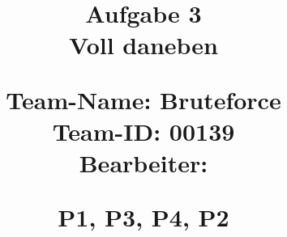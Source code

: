 \documentclass{article}
\begin{document}
\title{
{\Huge Aufgabe 3\\Voll daneben\\}
\vspace{.5cm}
\begin{large}
Team-Name: Bruteforce\\
Team-ID: 00139\\
Bearbeiter:\\ 
\end{large}
\begin{normalsize}
P1,
P3,
P4,
P2
\end{normalsize}
}
\author{}
\date{}
\maketitle
\vspace{5cm}
\tableofcontents
\newpage
\end{document}
